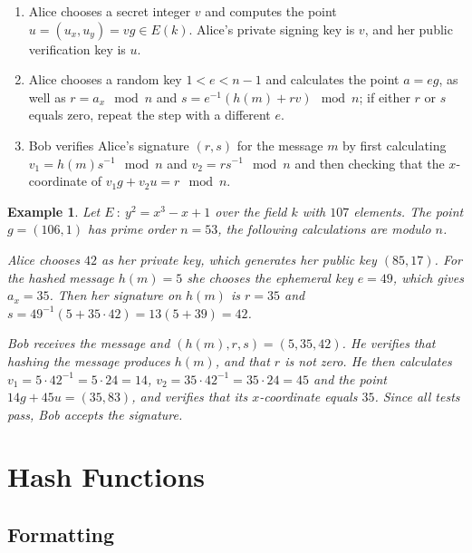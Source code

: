 \documentclass[a4paper,12pt]{article}
\newtheorem*{example}{Example}
\begin{document}
\begin{enumerate}[1)]

\item Alice chooses a secret integer $v$ and computes the point $u = (u_x,u_y) = vg \in E(k)$. Alice's private signing key is $v$, and her public verification key is $u$.

\item Alice chooses a random key $1 < e < n-1$ and calculates the point $a = eg$, as well as $r = a_x \mod n$ and $s = e^{-1}(h(m)+rv) \mod n$; if either $r$ or $s$ equals zero, repeat the step with a different $e$.

\item Bob verifies Alice's signature $(r,s)$ for the message $m$ by first calculating $v_1 = h(m)s^{-1} \mod n$ and $v_2 = rs^{-1} \mod n$ and then checking that the $x$-coordinate of $v_1 g+v_2 u = r \mod n$.
\end{enumerate}

\begin{example}
Let $E\ :\ y^2=x^3-x+1$ over the field $k$ with $107$ elements. The point $g = (106,1)$ has prime order $n=53$, the following calculations are modulo $n$.

Alice chooses $42$ as her private key, which generates her public key $(85,17)$. For the hashed message $h(m) = 5$ she chooses the ephemeral key $e = 49$, which gives $a_x = 35$. Then her signature on $h(m)$ is $r = 35$ and $s = 49^{-1}(5+35 \cdot 42) = 13(5+39) = 42$.

Bob receives the message and $(h(m), r, s) = (5,35,42)$. He verifies that hashing the message produces $h(m)$, and that $r$ is not zero. He then calculates $v_1 = 5 \cdot 42^{-1} = 5\cdot 24 = 14$, $v_2 = 35\cdot42^{-1}=35\cdot24 = 45$ and the point $14g+45u = (35,83)$, and verifies that its $x$-coordinate equals $35$. Since all tests pass, Bob accepts the signature.
\end{example}

\begin{comment}
\begin{align*}
\left. a+b \right. \ \ \ \ \ \ \
\left. 1+2 \right.
\end{align*}
\end{comment}

\newpage
\section{Hash Functions}

\subsection{Formatting}
\end{document}
